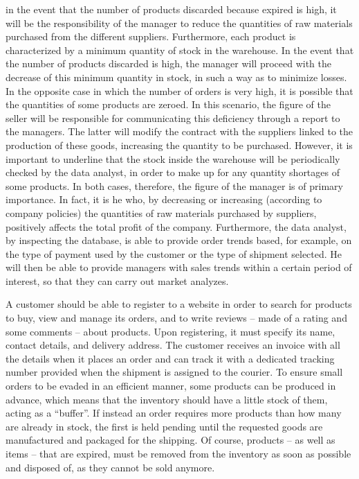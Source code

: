 in the event that the number of products discarded because expired is high, it will be the responsibility of the manager to reduce the quantities of raw materials
purchased from the different suppliers. Furthermore, each product is characterized by a minimum quantity of stock in the warehouse. In the event that the number of
products discarded is high, the manager will proceed with the decrease of this minimum quantity in stock, in such a way as to minimize losses.
In the opposite case in which the number of orders is very high, it is possible that the quantities of some products are zeroed. In this scenario, the figure of
the seller will be responsible for communicating this deficiency through a report to the managers. The latter will modify the contract with the suppliers linked
to the production of these goods, increasing the quantity to be purchased.
However, it is important to underline that the stock inside the warehouse will be periodically checked by the data analyst, in order to make up for any quantity
shortages of some products.
In both cases, therefore, the figure of the manager is of primary importance. In fact, it is he who, by decreasing or increasing (according to company policies)
the quantities of raw materials purchased by suppliers, positively affects the total profit of the company.
Furthermore, the data analyst, by inspecting the database, is able to provide order trends based, for example, on the type of payment used by the customer or
the type of shipment selected. He will then be able to provide managers with sales trends within a certain period of interest, so that they can carry out market analyzes.

A customer should be able to register to a website in order to search for products to buy, view and manage its orders, and to write reviews -- made of a rating and
some comments -- about products. Upon registering, it must specify its name, contact details, and delivery address. The customer receives an invoice with all the
details when it places an order and can track it with a dedicated tracking number provided when the shipment is assigned to the courier. To ensure small orders to
be evaded in an efficient manner, some products can be produced in advance, which means that the inventory should have a little stock of them, acting as a ``buffer''.
If instead an order requires more products than how many are already in stock, the first is held pending until the requested goods are manufactured and packaged for
the shipping. Of course, products -- as well as items -- that are expired, must be removed from the inventory as soon as possible and disposed of, as they cannot be
sold anymore.

